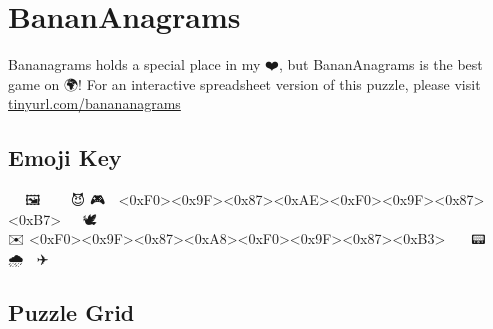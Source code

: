 \documentclass[11pt]{article}
\begin{document}
\sloppy

\section*{BananAnagrams}

Bananagrams holds a special place in my ❤️, but BananAnagrams is the best game on 🌍!
For an interactive spreadsheet version of this puzzle, please visit \url{tinyurl.com/banananagrams}

\subsection*{Emoji Key}

\noindent 🦍 💪 🖼️ 👀 🔗 🧥 😈 🎮 🍇 <0xF0><0x9F><0x87><0xAE><0xF0><0x9F><0x87><0xB7> 🍖 🍋 🕊️ 🏄‍♀️ 🗿 🍺 \\ %

\noindent ✉️ <0xF0><0x9F><0x87><0xA8><0xF0><0x9F><0x87><0xB3> 👨‍✈️ 🍈 📟 🫛 🎱 🌧️ 🐑 ✈️ 🌮 🧐 👩‍🍳 \\ %

\subsection*{Puzzle Grid}
\end{document}
